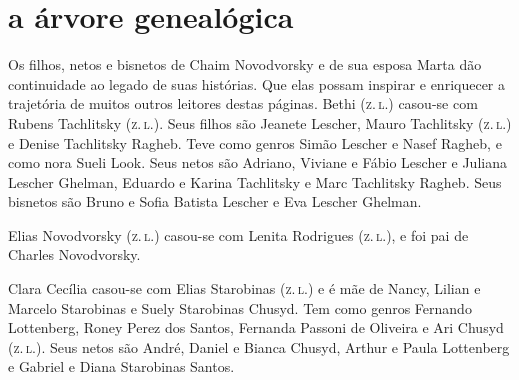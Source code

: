 
\section{a árvore genealógica}

Os filhos, netos e bisnetos de Chaim Novodvorsky e de sua esposa Marta dão continuidade ao legado de suas histórias. Que elas possam inspirar e enriquecer a trajetória de muitos outros leitores destas páginas. Bethi (\textsc{z.\,l.}) casou-se com Rubens Tachlitsky (\textsc{z.\,l.}). Seus filhos são Jeanete Lescher, Mauro Tachlitsky (\textsc{z.\,l.}) e Denise Tachlitsky Ragheb. Teve como genros Simão Lescher e Nasef Ragheb, e como nora Sueli Look. Seus netos são Adriano, Viviane e Fábio Lescher e Juliana Lescher Ghelman, Eduardo e Karina Tachlitsky e Marc Tachlitsky Ragheb. Seus bisnetos são Bruno e Sofia Batista Lescher e Eva Lescher Ghelman.

Elias Novodvorsky (\textsc{z.\,l.}) casou-se com Lenita Rodrigues (\textsc{z.\,l.}), e foi pai de Charles Novodvorsky.

Clara Cecília casou-se com Elias Starobinas (\textsc{z.\,l.}) e é mãe de Nancy, Lilian e Marcelo Starobinas e Suely Starobinas Chusyd. Tem como genros Fernando Lottenberg, Roney Perez dos Santos, Fernanda Passoni de Oliveira e Ari Chusyd (\textsc{z.\,l.}). Seus netos são André, Daniel e Bianca Chusyd, Arthur e Paula Lottenberg e Gabriel e Diana Starobinas Santos.